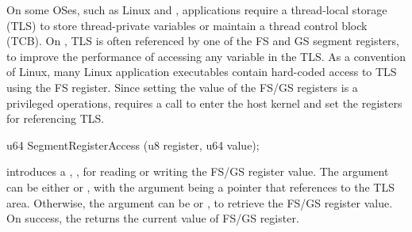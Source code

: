



On some OSes, such as Linux and \win{}, applications require a thread-local storage (TLS)
to store thread-private variables or maintain a thread control block (TCB).
On \graphenearch{},
TLS is often referenced by one of the FS and GS segment registers,
to improve the performance of accessing any variable in the TLS.
As a convention of Linux, many Linux application executables
contain hard-coded access to TLS
using the FS register.
Since setting the value of the FS/GS registers is a privileged operations,
\thehostabi{} requires a call to enter the host kernel
and set the registers for referencing TLS.






\begin{paldef}
u64 SegmentRegisterAccess (u8 register, u64 value);
\end{paldef}




\Thehostabi{} introduces a \hostapi{}, , for reading or writing the FS/GS register value.
The  argument can be either  or ,
with the  argument
being a pointer that references to the TLS area.
Otherwise, the  argument
can be  or ,
to retrieve the FS/GS register value.
On success, the \hostapi{} returns the current value of FS/GS register.



